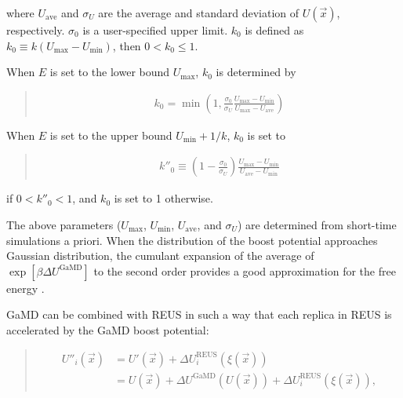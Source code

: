 \documentclass[a4paper,11pt,oneside,english]{sphinxmanual}
\begin{document}
where \(U_{\mathrm{ave}}\) and \(\sigma_{U}\) are the average
and standard deviation of \(U(\vec{x})\), respectively.
\(\sigma_0\) is a user-specified upper limit.
\(k_0\) is defined as \(k_0 \equiv k(U_{\mathrm{max}}-U_{\mathrm{min}})\),
then \(0 < k_0 \le 1\).

When \(E\) is set to the lower bound \(U_{\mathrm{max}}\),
\(k_0\) is determined by
\begin{quote}

\vspace{-5mm}
\begin{equation*}
\begin{split}k_0 = \min \left(1,\frac{\sigma_0}{\sigma_U}\frac{U_{\mathrm{max}}-U_{\mathrm{min}}}{U_{\mathrm{max}}-U_{\mathrm{ave}}}\right)\end{split}
\end{equation*}
\vspace{-3mm}
\end{quote}

When \(E\) is set to the upper bound \(U_{\mathrm{min}}+1/k\),
\(k_0\) is set to
\begin{quote}

\vspace{-5mm}
\begin{equation*}
\begin{split}k''_0 \equiv \left(1-\frac{\sigma_0}{\sigma_U}\right)\frac{U_{\mathrm{max}}-U_{\mathrm{min}}}{U_{\mathrm{ave}}-U_{\mathrm{min}}}\end{split}
\end{equation*}
\vspace{-3mm}
\end{quote}

if \(0 < k''_0 < 1\), and \(k_0\) is set to 1 otherwise.

The above parameters
(\(U_{\mathrm{max}}\), \(U_{\mathrm{min}}\), \(U_{\mathrm{ave}}\), and \(\sigma_{U}\))
are determined from short-time simulations a priori.
When the distribution of the boost potential approaches Gaussian distribution,
the cumulant expansion of the average of \(\exp[\beta \Delta U^\mathrm{GaMD}]\)
to the second order provides a good approximation for the free energy .

GaMD can be combined with REUS in such a way that each replica in REUS is accelerated by the GaMD boost potential:
\begin{quote}

\vspace{-5mm}
\begin{equation*}
\begin{split}U''_i(\vec{x}) &= U'(\vec{x}) + \Delta U_i^{\mathrm{REUS}}\left(\xi(\vec{x})\right) \\
&= U(\vec{x}) + \Delta U^{\mathrm{GaMD}}\left(U(\vec{x})\right) + \Delta U_i^{\mathrm{REUS}}\left(\xi(\vec{x})\right),\end{split}
\end{equation*}
\vspace{-3mm}
\end{quote}
\end{document}
